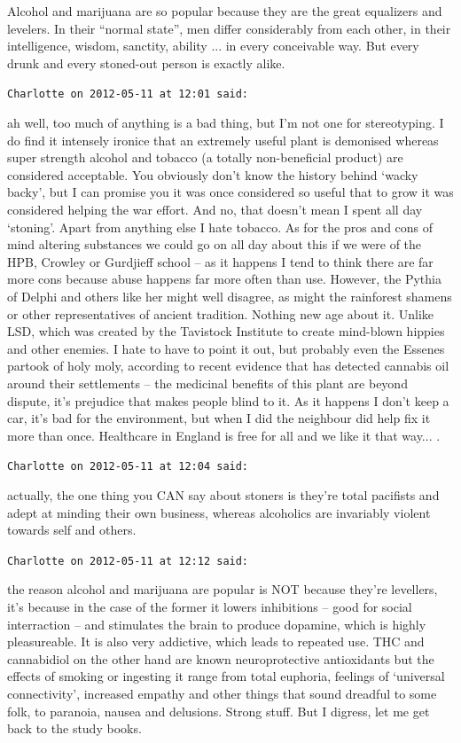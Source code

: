 \begin{footnotesize}
\begin{sffamily}
Alcohol and marijuana are so popular because they are the great equalizers and levelers. In their ``normal state'', men differ considerably from each other, in their intelligence, wisdom, sanctity, ability ... in every conceivable way. But every drunk and every stoned-out person is exactly alike.

\hfill

\texttt{Charlotte on 2012-05-11 at 12:01 said:}

ah well, too much of anything is a bad thing, but I'm not one for stereotyping. I do find it intensely ironice that an extremely useful plant is demonised whereas super strength alcohol and tobacco (a totally non-beneficial product) are considered acceptable. You obviously don't know the history behind `wacky backy', but I can promise you it was once considered so useful that to grow it was considered helping the war effort. And no, that doesn't mean I spent all day `stoning'. Apart from anything else I hate tobacco. As for the pros and cons of mind altering substances we could go on all day about this if we were of the HPB, Crowley or Gurdjieff school -- as it happens I tend to think there are far more cons because abuse happens far more often than use. However, the Pythia of Delphi and others like her might well disagree, as might the rainforest shamens or other representatives of ancient tradition. Nothing new age about it. Unlike LSD, which was created by the Tavistock Institute to create mind-blown hippies and other enemies. I hate to have to point it out, but probably even the Essenes partook of holy moly, according to recent evidence that has detected cannabis oil around their settlements -- the medicinal benefits of this plant are beyond dispute, it's prejudice that makes people blind to it. As it happens I don't keep a car, it's bad for the environment, but when I did the neighbour did help fix it more than once. Healthcare in England is free for all and we like it that way... .

\hfill

\texttt{Charlotte on 2012-05-11 at 12:04 said:}

actually, the one thing you CAN say about stoners is they're total pacifists and adept at minding their own business, whereas alcoholics are invariably violent towards self and others.

\hfill

\texttt{Charlotte on 2012-05-11 at 12:12 said:}

the reason alcohol and marijuana are popular is NOT because they're levellers, it's because in the case of the former it lowers inhibitions -- good for social interraction -- and stimulates the brain to produce dopamine, which is highly pleasureable. It is also very addictive, which leads to repeated use. THC and cannabidiol on the other hand are known neuroprotective antioxidants but the effects of smoking or ingesting it range from total euphoria, feelings of `universal connectivity', increased empathy and other things that sound dreadful to some folk, to paranoia, nausea and delusions. Strong stuff. But I digress, let me get back to the study books.


\end{sffamily}
\end{footnotesize}
